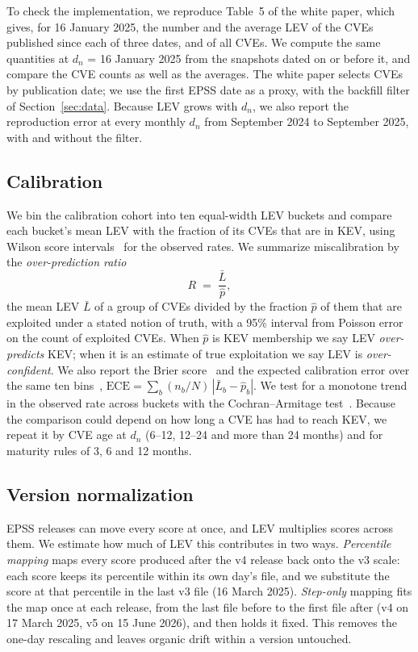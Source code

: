 To check the implementation, we reproduce Table~5 of the white paper, which
gives, for 16 January 2025, the number and the average LEV of the CVEs
published since each of three dates, and of all CVEs. We compute the same
quantities at $d_n$ = 16 January 2025 from the snapshots dated on or before
it, and compare the CVE counts as well as the averages. The white paper
selects CVEs by publication date; we use the first EPSS date as a proxy, with
the backfill filter of Section~\ref{sec:data}. Because LEV grows with $d_n$,
we also report the reproduction error at every monthly $d_n$ from September
2024 to September 2025, with and without the filter.

\subsection{Calibration}\label{sec:m-calib}

We bin the calibration cohort into ten equal-width LEV buckets and compare each
bucket's mean LEV with the fraction of its CVEs that are in KEV, using Wilson
score intervals~\cite{wilson1927} for the observed rates. We summarize
miscalibration by the \emph{over-prediction ratio}
\begin{equation}\label{eq:ratio}
R \;=\; \frac{\bar{L}}{\hat{p}},
\end{equation}
the mean LEV $\bar{L}$ of a group of CVEs divided by the fraction $\hat{p}$ of
them that are exploited under a stated notion of truth, with a 95\% interval
from Poisson error on the count of exploited CVEs. When $\hat{p}$ is KEV
membership we say LEV \emph{over-predicts} KEV; when it is an estimate of true
exploitation we say LEV is \emph{over-confident}. We also report the Brier
score~\cite{brier1950} and the expected calibration error over the same ten
bins~\cite{naeini2015ece},
$\mathrm{ECE} = \sum_b (n_b/N)\,|\bar{L}_b - \hat{p}_b|$. We test for a
monotone trend in the observed rate across buckets with the Cochran--Armitage
test~\cite{armitage1955trend}. Because the comparison could depend on how long a CVE has had to reach
KEV, we repeat it by CVE age at $d_n$ (6--12, 12--24 and more than 24 months)
and for maturity rules of 3, 6 and 12 months.

\subsection{Version normalization}\label{sec:m-version}

EPSS releases can move every score at once, and LEV multiplies scores across
them. We estimate how much of LEV this contributes in two ways.
\emph{Percentile mapping} maps every score produced after the v4 release back
onto the v3 scale: each score keeps its percentile within its own day's file,
and we substitute the score at that percentile in the last v3 file
(16 March 2025). \emph{Step-only} mapping fits the map once at each release,
from the last file before to the first file after (v4 on 17 March 2025, v5 on
15 June 2026), and then holds it fixed. This removes the one-day rescaling and
leaves organic drift within a version untouched.

